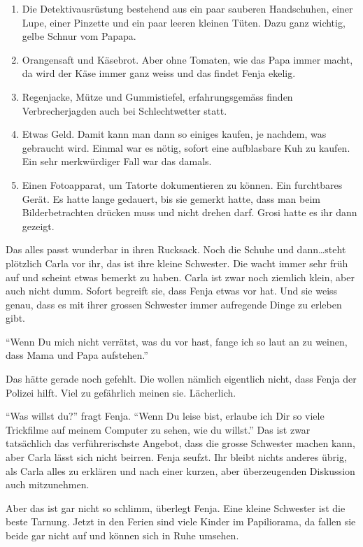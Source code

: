 \begin{enumerate}
  \item Die Detektivausrüstung bestehend aus ein paar sauberen Handschuhen, einer Lupe, einer Pinzette und ein paar leeren kleinen Tüten. Dazu ganz wichtig, gelbe Schnur vom Papapa.
  \item Orangensaft und Käsebrot. Aber ohne Tomaten, wie das Papa immer macht, da wird der Käse immer ganz weiss und das findet Fenja ekelig.
  \item Regenjacke, Mütze und Gummistiefel, erfahrungsgemäss finden Verbrecherjagden auch bei Schlechtwetter statt.
  \item Etwas Geld. Damit kann man dann so einiges kaufen, je nachdem, was gebraucht wird. Einmal war es nötig, sofort eine aufblasbare Kuh zu kaufen. Ein sehr merkwürdiger Fall war das damals.
  \item Einen Fotoapparat, um Tatorte dokumentieren zu können. Ein furchtbares Gerät. Es hatte lange gedauert, bis sie gemerkt hatte, dass man beim Bilderbetrachten drücken muss und nicht drehen darf. Grosi hatte es ihr dann gezeigt.
\end{enumerate}

Das alles passt wunderbar in ihren Rucksack. Noch die Schuhe und dann\dots steht plötzlich Carla vor ihr, das ist ihre kleine Schwester. Die wacht immer sehr früh auf und scheint etwas bemerkt zu haben. Carla ist zwar noch ziemlich klein, aber auch nicht dumm. Sofort begreift sie, dass Fenja etwas vor hat. Und sie weiss genau, dass es mit ihrer grossen Schwester immer aufregende Dinge zu erleben gibt.

\enquote{Wenn Du mich nicht verrätst, was du vor hast, fange ich so laut an zu weinen, dass Mama und Papa aufstehen.}

Das hätte gerade noch gefehlt. Die wollen nämlich eigentlich nicht, dass Fenja der Polizei hilft. Viel zu gefährlich meinen sie. Lächerlich. 

\enquote{Was willst du?} fragt Fenja. \enquote{Wenn Du leise bist, erlaube ich Dir so viele Trickfilme auf meinem Computer zu sehen, wie du willst.} Das ist zwar tatsächlich das verführerischste Angebot, dass die grosse Schwester machen kann, aber Carla lässt sich nicht beirren. Fenja seufzt. Ihr bleibt nichts anderes übrig, als Carla alles zu erklären und nach einer kurzen, aber überzeugenden Diskussion auch mitzunehmen. 

Aber das ist gar nicht so schlimm, überlegt Fenja. Eine kleine Schwester ist die beste Tarnung.   Jetzt in den Ferien sind viele Kinder im Papiliorama, da fallen sie beide gar nicht auf und können sich in Ruhe umsehen.

